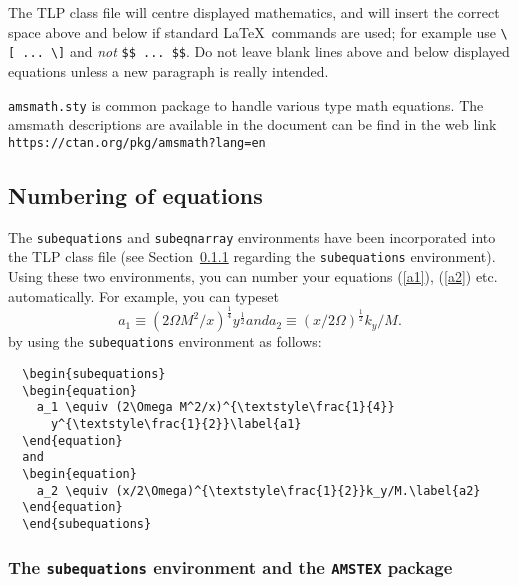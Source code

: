\documentclass{tlp}
\begin{document}
The TLP class file will centre displayed mathematics, and will insert the
correct space above and below if standard \LaTeX\ commands are used; for
example use \verb"\[ ... \]" and \emph{not} \verb"$$ ... $$". Do not leave
blank lines above and below displayed equations unless a new paragraph is
really intended.

\verb"amsmath.sty" is common package to handle various type math equations. The amsmath descriptions are available in the document can be find in the web link \verb"https://ctan.org/pkg/amsmath?lang=en"

\subsection{Numbering of equations}

The \verb"subequations" and \verb"subeqnarray" environments have been
incorporated into the TLP class file (see Section~\ref{sub:amstex} regarding
the \verb"subequations" environment). Using these two environments,
you can number your equations (\ref{a1}), (\ref{a2}) etc. automatically.
For example, you can typeset
  \begin{subequations}
  \begin{equation}
    a_1 \equiv (2\Omega M^2/x)^{\textstyle\frac{1}{4}}
      y^{\textstyle\frac{1}{2}}\label{a1}
  \end{equation}
  and
  \begin{equation}
    a_2 \equiv (x/2\Omega)^{\textstyle\frac{1}{2}}k_y/M.\label{a2}
  \end{equation}
  \end{subequations}
by using the \verb"subequations" environment as follows:
%
\begin{verbatim}
  \begin{subequations}
  \begin{equation}
    a_1 \equiv (2\Omega M^2/x)^{\textstyle\frac{1}{4}}
      y^{\textstyle\frac{1}{2}}\label{a1}
  \end{equation}
  and
  \begin{equation}
    a_2 \equiv (x/2\Omega)^{\textstyle\frac{1}{2}}k_y/M.\label{a2}
  \end{equation}
  \end{subequations}
\end{verbatim}

\subsubsection{The \texttt{subequations} environment and the
  \texttt{AMSTEX} package} \label{sub:amstex}
\end{document}
